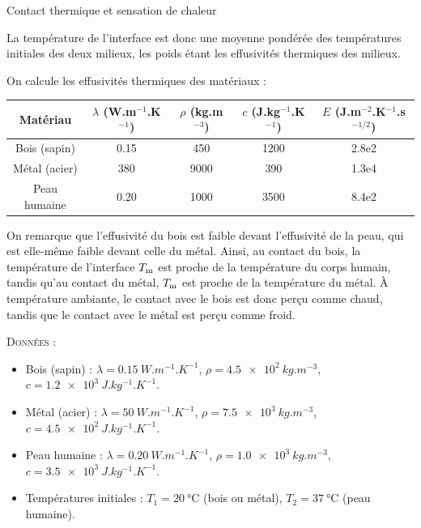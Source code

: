 \begin{exo}[PC][1][colle]{Contact thermique et sensation de chaleur}
\begin{quest}
{      
      La température de l’interface est donc une moyenne pondérée des températures initiales des deux milieux, les poids étant les effusivités thermiques des milieux.
    }
    {
    On calcule les effusivités thermiques des matériaux :
    \begin{center}
      \begin{tabular}{|c|c|c|c|c|}
        \hline
      Matériau & $\lambda$ (W.m$^{-1}$.K$^{-1}$) & $\rho$ (kg.m$^{-3}$) & $c$ (J.kg$^{-1}$.K$^{-1}$) & $E$ (J.m$^{-2}$.K$^{-1}$.s$^{-1/2}$) \\
      \hline
      Bois (sapin) & 0.15 & 450 & 1200 & 2.8e2 \\
      Métal (acier) & 380 & 9000 & 390 & 1.3e4 \\
      Peau humaine & 0.20 & 1000 & 3500 & 8.4e2 \\
      \hline
    \end{tabular}
  \end{center}
  On remarque que l’effusivité du bois est faible devant l’effusivité de la peau, qui est elle-même faible devant celle du métal. Ainsi, au contact du bois, la température de l’interface $T_{\rm m}$ est proche de la température du corps humain, tandis qu’au contact du métal, $T_{\rm m}$ est proche de la température du métal. À température ambiante, le contact avec le bois est donc perçu comme chaud, tandis que le contact avec le métal est perçu comme froid.
    }
  \end{quest}
  \textsc{Données} :
  \begin{itemize}
    \item Bois (sapin) : $\lambda = \SI{0.15}{W.m^{-1}.K^{-1}}$, $\rho = \SI{4.5e2}{kg.m^{-3}}$, $c = \SI{1.2e3}{J.kg^{-1}.K^{-1}}$.
    \item Métal (acier) : $\lambda = \SI{50}{W.m^{-1}.K^{-1}}$, $\rho = \SI{7.5e3}{kg.m^{-3}}$, $c = \SI{4.5e2}{J.kg^{-1}.K^{-1}}$.
    \item Peau humaine : $\lambda = \SI{0.20}{W.m^{-1}.K^{-1}}$, $\rho = \SI{1.0e3}{kg.m^{-3}}$, $c = \SI{3.5e3}{J.kg^{-1}.K^{-1}}$.
    \item Températures initiales : $T_1 = \SI{20}{\celsius}$ (bois ou métal), $T_2 = \SI{37}{\celsius}$ (peau humaine).
  \end{itemize}
\end{exo}

